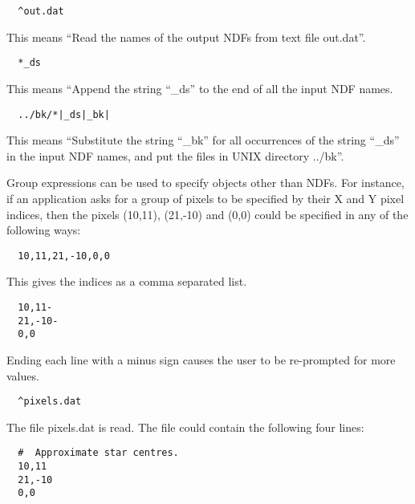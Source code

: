 \begin{itemize}
\small
\begin{verbatim}
  ^out.dat
\end{verbatim}
\normalsize
\vspace{-3mm}
This means ``Read the names of the output {\small NDF}s from
text file out.dat''.

\small
\begin{verbatim}
  *_ds
\end{verbatim}
\normalsize
\vspace{-3mm}
This means ``Append the string ``\_ds'' to the end of all
                      the input {\small NDF} names.

\small
\begin{verbatim}
  ../bk/*|_ds|_bk|
\end{verbatim}
\normalsize
\vspace{-3mm}
This means ``Substitute the string ``\_bk'' for all  occurrences of the string
``\_ds'' in the  input {\small NDF} names, and put the files in {\small UNIX}
directory ../bk''.
\end{itemize}

Group expressions can be used to specify objects other than {\small
NDF}s. For instance,  if an application asks for a group of pixels to
be specified by  their X and Y pixel indices, then the pixels (10,11),
(21,-10) and (0,0) could be specified in any of the following ways:

\small
\begin{verbatim}
  10,11,21,-10,0,0
\end{verbatim}
\normalsize
\vspace{-3mm}
This gives the indices as a comma separated list.

\small
\begin{verbatim}
  10,11-
  21,-10-
  0,0
\end{verbatim}
\normalsize
\vspace{-3mm}
Ending each line with a minus  sign causes the user to be re-prompted for more
values.

\small
\begin{verbatim}
  ^pixels.dat
\end{verbatim}
\normalsize
\vspace{-3mm}
The file pixels.dat is read. The file could contain the  following four lines:

\small
\begin{verbatim}
  #  Approximate star centres.
  10,11
  21,-10
  0,0
\end{verbatim}
\normalsize

